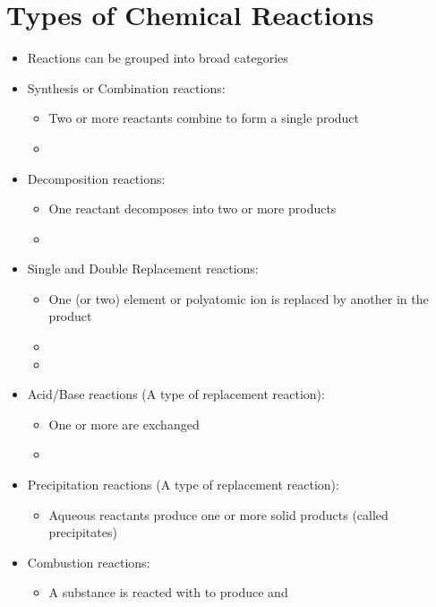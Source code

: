 \documentclass[12pt, openany, letterpaper]{memoir}
\begin{document}
\section{Types of Chemical Reactions}
\begin{itemize}
	\item Reactions can be grouped into broad categories
	\item Synthesis or Combination reactions:
	      \begin{itemize}
		      \item Two or more reactants combine to form a single product
		      \item {}
	      \end{itemize}
	\item Decomposition reactions:
	      \begin{itemize}
		      \item One reactant decomposes into two or more products
		      \item {}
	      \end{itemize}
	\item Single and Double Replacement reactions:
	      \begin{itemize}
		      \item One (or two) element or polyatomic ion is replaced by another in the product
		      \item {}
		      \item {}
	      \end{itemize}
	\item Acid/Base reactions (A type of replacement reaction):
	      \begin{itemize}
		      \item  One or more  are exchanged
		      \item {}
	      \end{itemize}
	\item Precipitation reactions (A type of replacement reaction):
	      \begin{itemize}
		      \item Aqueous reactants produce one or more solid products (called precipitates)
	      \end{itemize}
	\item Combustion reactions:
	      \begin{itemize}
		      \item A substance is reacted with  to produce  and 

\end{itemize}
\end{itemize}
\end{document}
